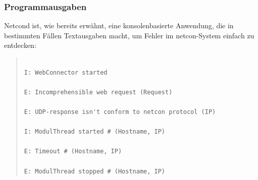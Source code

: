 \documentclass[a4paper,14pt,headsepline]{scrartcl}
\begin{document}
\newpage

\begin{figure}[h]
\begin{center}
\end{center}
\end{figure}

\begin{figure}[h]
\begin{center}
\end{center}
\end{figure}

\newpage

\subsubsection{Programmausgaben}

Netcond ist, wie bereits erwähnt, eine konsolenbasierte Anwendung, die in bestimmten Fällen Textausgaben macht, um Fehler im netcon-System einfach zu entdecken:

\begin{quote}
\begin{verbatim}

I: WebConnector started

E: Incomprehensible web request (Request)

E: UDP-response isn't conform to netcon protocol (IP)

I: ModulThread started # (Hostname, IP)

E: Timeout # (Hostname, IP)

E: ModulThread stopped # (Hostname, IP)

\end{verbatim}
\end{quote} 
\end{document}

